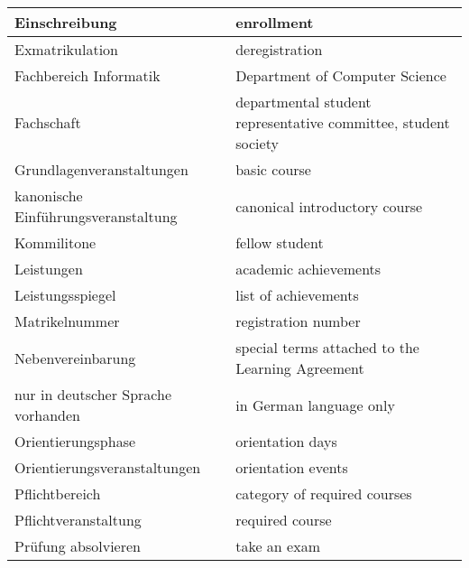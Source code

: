 \begin{longtable} {|p{.5\linewidth}|p{.5\linewidth}|}
    \hline
    Einschreibung                       & enrollment                                                     \\
    \hline
    Exmatrikulation                     & deregistration                                                 \\
    \hline
    Fachbereich Informatik              & Department of Computer Science                                 \\
    \hline
    Fachschaft                          & departmental student representative committee, student society \\
    \hline
    Grundlagenveranstaltungen           & basic course                                                   \\
    \hline
    kanonische Einführungsveranstaltung & canonical introductory course                                  \\
    \hline
    Kommilitone                         & fellow student                                                 \\
    \hline
    Leistungen                          & academic achievements                                          \\
    \hline
    Leistungsspiegel                    & list of achievements                                           \\
    \hline
    Matrikelnummer                      & registration number                                            \\
    \hline
    Nebenvereinbarung                   & special terms attached to the Learning Agreement               \\
    \hline
    nur in deutscher Sprache vorhanden  & in German language only                                        \\
    \hline
    Orientierungsphase                  & orientation days                                               \\
    \hline
    Orientierungsveranstaltungen        & orientation events                                             \\
    \hline
    Pflichtbereich                      & category of required courses                                   \\
    \hline
    Pflichtveranstaltung                & required course                                                \\
    \hline
    Prüfung absolvieren                 & take an exam                                                   \\

\end{longtable}
